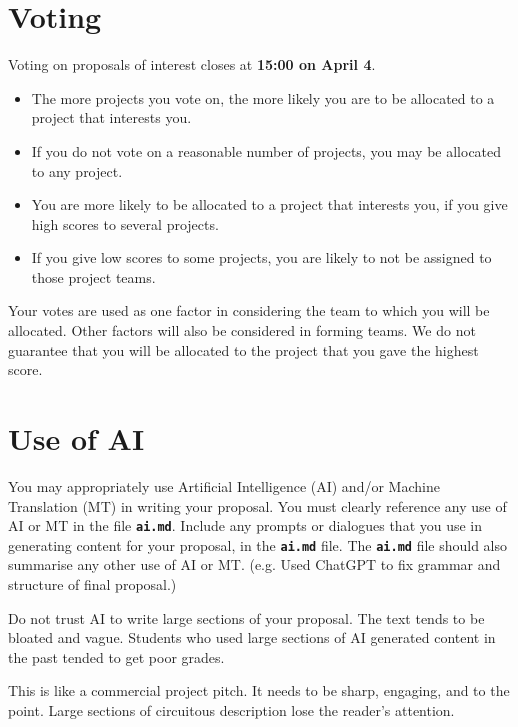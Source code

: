 \documentclass{csse4400}
\begin{document}
\section{Voting}
Voting on proposals of interest closes at \textbf{15:00 on April 4}.

\begin{itemize}
    \item The more projects you vote on, the more likely you are to be allocated to a project that interests you.
    \item If you do not vote on a reasonable number of projects, you may be allocated to any project.
    \item You are more likely to be allocated to a project that interests you,
          if you give high scores to several projects.
    \item If you give low scores to some projects, you are likely to not be assigned to those project teams.
\end{itemize}

\noindent
Your votes are used as one factor in considering the team to which you will be allocated.
Other factors will also be considered in forming teams.
We do not guarantee that you will be allocated to the project that you gave the highest score.


\section{Use of AI}
You may appropriately use Artificial Intelligence (AI) and/or Machine Translation (MT) in writing your proposal.
You must clearly reference any use of AI or MT in the file \textbf{\texttt{ai.md}}.
Include any prompts or dialogues that you use in generating content for your proposal, in the \textbf{\texttt{ai.md}} file.
The \textbf{\texttt{ai.md}} file should also summarise any other use of AI or MT.
(e.g. Used ChatGPT to fix grammar and structure of final proposal.)

Do not trust AI to write large sections of your proposal.
The text tends to be bloated and vague.
Students who used large sections of AI generated content in the past tended to get poor grades.

This is like a commercial project pitch.
It needs to be sharp, engaging, and to the point.
Large sections of circuitous description lose the reader's attention.
\end{document}
